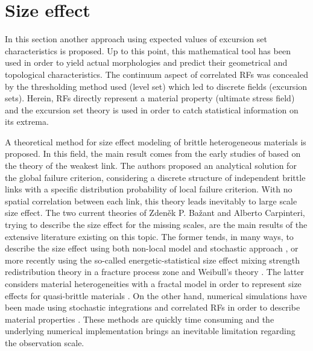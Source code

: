 \documentclass[12pt]{article}
\begin{document}
\section{Size effect}
In this section another approach using expected values of excursion set characteristics is proposed. Up to this point, this mathematical tool has been used in order to yield actual morphologies and predict their geometrical and topological characteristics. The continuum aspect of correlated RFs was concealed by the thresholding method used (level set) which led to discrete fields (excursion sets). Herein, RFs directly represent a material property (ultimate stress field) and the excursion set theory is used in order to catch statistical information on its extrema.
\par A theoretical method for size effect modeling of brittle heterogeneous materials is proposed. In this field, the main result comes from the early studies of \cite{weibull_statistical_1951} based on the theory of the weakest link. The authors proposed an analytical solution for the global failure criterion, considering a discrete structure of independent brittle links with a specific distribution probability of local failure criterion. With no spatial correlation between each link, this theory leads inevitably to large scale size effect. The two current theories of Zden\v{e}k P. Ba\v{z}ant and Alberto Carpinteri, trying to describe the size effect for the missing scales, are the main results of the extensive literature existing on this topic. The former tends, in many ways, to describe the size effect using both non-local model and stochastic approach \cite{sab_unified_1993}, or more recently using the so-called energetic-statistical size effect mixing strength redistribution theory in a fracture process zone and Weibull's theory \cite{bazant_probability_2004}. The latter considers material heterogeneities with a fractal model in order to represent size effects for quasi-brittle materials \cite{carpinteri_mechanics_2003}. On the other hand, numerical simulations have been made using stochastic integrations and correlated RFs in order to describe material properties \cite{colliat_stochastic_2007}. These methods are quickly time consuming and the underlying numerical implementation brings an inevitable limitation regarding the observation scale.
\end{document}
